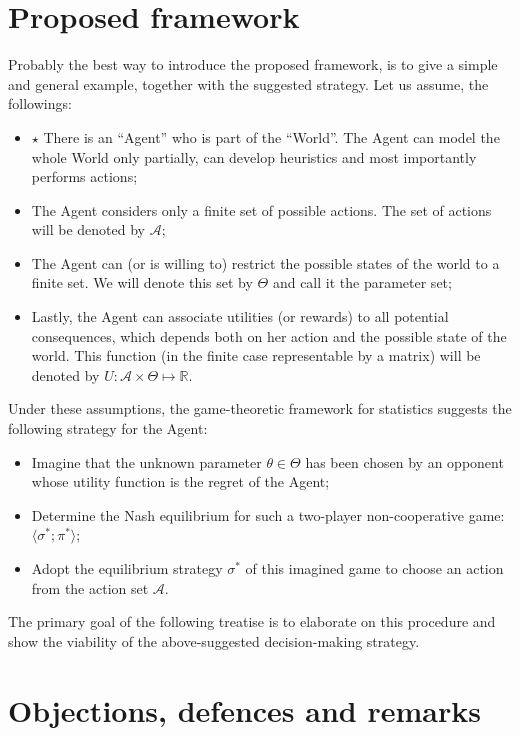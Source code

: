 \documentclass{article}
\begin{document}
\section*{Proposed framework}

Probably the best way to introduce the proposed framework, is to give a simple and general example, together with the suggested strategy. Let us assume, the followings:

\begin{itemize}
    \item $\star$ There is an ``Agent'' who is part of the ``World''. The Agent can model the whole World only partially, can develop heuristics and most importantly performs actions;
    \item The Agent considers only a finite set of possible actions. The set of actions will be denoted by $\mathcal{A}$;
    \item The Agent can (or is willing to) restrict the possible states of the world to a finite set. We will denote this set by $\Theta$ and call it the parameter set;
    \item Lastly, the Agent can associate utilities (or rewards) to all potential consequences, which depends both on her action and the possible state of the world. This function (in the finite case representable by a matrix) will be denoted by $U: \mathcal{A} \times \Theta \mapsto \mathbb{R}$.
\end{itemize}

Under these assumptions, the game-theoretic framework for statistics suggests the following strategy for the Agent:

\begin{itemize}
    \item Imagine that the unknown parameter $\theta \in \Theta$ has been chosen by an opponent whose utility function is the regret of the Agent;
    \item Determine the Nash equilibrium for such a two-player non-cooperative game: $\langle \sigma^*; \pi^* \rangle$;
    \item Adopt the equilibrium strategy $\sigma^*$ of this imagined game to choose an action from the action set $\mathcal{A}$.
\end{itemize}

The primary goal of the following treatise is to elaborate on this procedure and show the viability of the above-suggested decision-making strategy.


\section*{Objections, defences and remarks}
\end{document}
